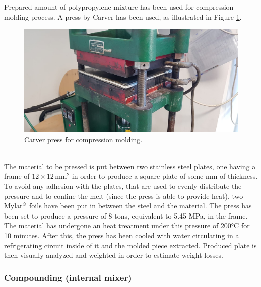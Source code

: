 \documentclass[a4paper, 11pt]{article}
\begin{document}
Prepared amount of polypropylene mixture has been used for compression molding process. A press by Carver has been used, as illustrated in Figure \ref{fig:press1}. 
\begin{figure}[htp]
	\centering
	\includegraphics[scale=0.2]
	{PHOTO-2019-05-23-17-38-03.jpg}
	\caption{Carver press for compression molding.}
	\label{fig:press1}
\end{figure}\\
The material to be pressed is put between two stainless steel plates, one having a frame of $12\times 12\, \text{mm}^2$ in order to produce a square plate of some mm of thickness. To avoid any adhesion with the plates, that are used to evenly distribute the pressure and to confine the melt (since the press is able to provide heat), two Mylar${^\text{\textregistered}}$ foils have been put in between the steel and the material. The press has been set to produce a pressure of 8 tons, equivalent to 5.45 MPa, in the frame. The material has undergone an heat treatment under this pressure of 200°C for 10 minutes. After this, the press has been cooled with water circulating in a refrigerating circuit inside of it and the molded piece extracted. Produced plate is then visually analyzed and weighted in order to estimate weight losses. \par 


\subsubsection{Compounding (internal mixer)}
\end{document}
